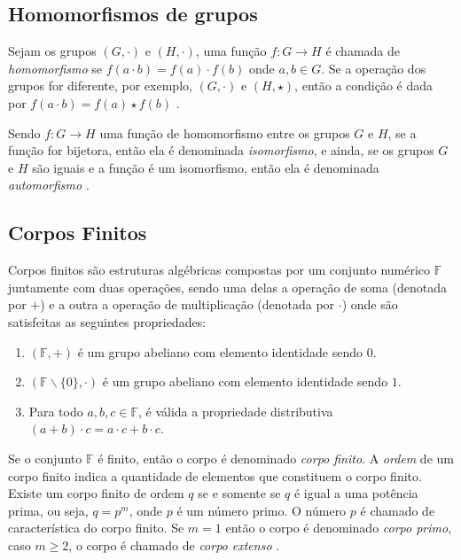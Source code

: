 %
%
\subsection{Homomorfismos de grupos}
Sejam os grupos $(G, \cdot)$ e $(H, \cdot)$, uma função $f: G \rightarrow H$ é chamada de \textit{homomorfismo} se $f(a \cdot b) = f(a) \cdot f(b)$ onde $a, b \in G$. Se a operação dos grupos for diferente, por exemplo, $(G, \cdot)$ e $(H, \star)$, então a condição é dada por $f(a \cdot b) = f(a) \star f(b)$ \cite{Gilbert:2004}.

Sendo $f: G \rightarrow H$ uma função de homomorfismo entre os grupos \(G\) e \(H\), se a função for bijetora, então ela é denominada \textit{isomorfismo}, e ainda, se os grupos \(G\) e \(H\) são iguais e a função é um isomorfismo, então ela é denominada \textit{automorfismo} \cite{Shokranian:2010}.

%
%
\subsection{Corpos Finitos}
Corpos finitos são estruturas algébricas compostas por um conjunto numérico \(\mathbb{F}\) juntamente com duas operações, sendo uma delas a operação de soma (denotada por $+$) e a outra a operação de multiplicação (denotada por $\cdot$) onde são satisfeitas as seguintes propriedades: \cite{Guide}

\begin{enumerate}
\item $(\mathbb{F}, +)$ é um grupo abeliano com elemento identidade sendo \(0\).
\item $(\mathbb{F} \backslash \{0\}, \cdot)$ é um grupo abeliano com elemento identidade sendo $1$.
\item Para todo $a, b, c \in \mathbb{F}$, é válida a propriedade distributiva $(a + b) \cdot c = a \cdot c + b \cdot c$.
\end{enumerate}

Se o conjunto \(\mathbb{F}\) é finito, então o corpo é denominado \textit{corpo finito}. A \textit{ordem} de um corpo finito indica a quantidade de elementos que constituem o corpo finito. Existe um corpo finito de ordem \(q\) se e somente se \(q\) é igual a uma potência prima, ou seja, $q = p^{m}$, onde \(p\) é um número primo. O número \(p\) é chamado de característica do corpo finito. Se $m = 1$ então o corpo é denominado \textit{corpo primo}, caso $m \geq 2$, o corpo é chamado de \textit{corpo extenso} \cite{Guide}.

